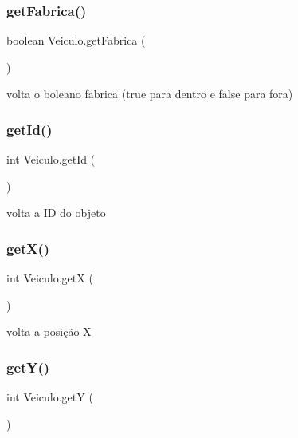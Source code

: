 \subsubsection{\texorpdfstring{get\+Fabrica()}{getFabrica()}}
{\footnotesize\ttfamily boolean Veiculo.\+get\+Fabrica (\begin{DoxyParamCaption}{ }\end{DoxyParamCaption})}



volta o boleano fabrica (true para dentro e false para fora) 

\mbox{\label{class_veiculo_a09c389362736b3ca90a0200e01545e73}} 
\subsubsection{\texorpdfstring{get\+Id()}{getId()}}
{\footnotesize\ttfamily int Veiculo.\+get\+Id (\begin{DoxyParamCaption}{ }\end{DoxyParamCaption})}



volta a ID do objeto 

\mbox{\label{class_veiculo_a235b29e1e25ec8c769b20fb2aeba8404}} 
\subsubsection{\texorpdfstring{get\+X()}{getX()}}
{\footnotesize\ttfamily int Veiculo.\+getX (\begin{DoxyParamCaption}{ }\end{DoxyParamCaption})}



volta a posição X 

\mbox{\label{class_veiculo_a06b2a923e51186673a016f75d10363d3}} 
\subsubsection{\texorpdfstring{get\+Y()}{getY()}}
{\footnotesize\ttfamily int Veiculo.\+getY (\begin{DoxyParamCaption}{ }\end{DoxyParamCaption})}



